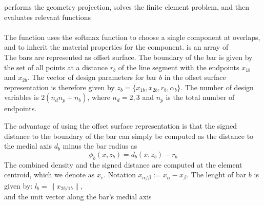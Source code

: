  performs the geometry projection, solves the finite element problem, and then evaluates relevant functions \\

\tikzcircle{2pt}\indent{}\\ 
The function uses the softmax function to choose a single component at overlaps, and to inherit the material properties for the component.  is an array of  \\
\indent\indent {}
The bars are represented as offset surface. The boundary of the bar is given by the set of all points at a distance $r_b$ of the line segment with the endpoints $x_{1b}$ and $x_{2b}$. The vector of design parameters for bar $b$ in the offset surface representation is therefore given by $z_{b}=\{x_{1b},x_{2b},r_{b},\alpha_{b}\}$. The number of design variables is $2(n_{d}n_{p}+n_{b})$, where $n_{d}=2,3$ and $n_p$ is the total number of endpoints. 

The advantage of using the  offset surface representation is that the signed distance to the boundary of the bar can simply be computed as the distance to the medial axis $d_b$ minus the bar radius as 
\begin{equation*}
    \phi_{b}(x,z_{b})=d_{b}(x,z_{b}) - r_{b}
\end{equation*}
The combined density and the signed distance are computed at the element centroid, which we denote as $x_{e}$. Notation $x_{\alpha/\beta}:=x_{\alpha}-x_{\beta}$.
The lenght of bar $b$ is given by: $l_b = \lVert x_{2b/1b} \rVert$, \\
and the unit vector along the bar's medial axis